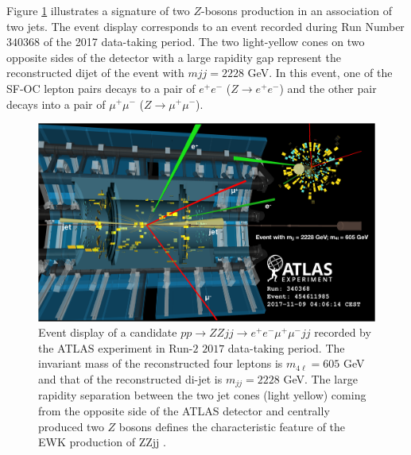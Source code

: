 Figure \ref{fig:EventDisplayZZjj} illustrates a signature of two $Z$-bosons production in an association of two jets. The event display corresponds to an event recorded during Run Number $340368$ of the 2017 data-taking period. The two light-yellow cones on two opposite sides of the detector with a large rapidity gap represent the reconstructed dijet of the event with $mjj = 2228$ GeV. In this event, one of the SF-OC lepton pairs decays to a pair of $e^+e^-$ ($Z\rightarrow e^+e^-$) and the other pair decays into a pair of $\mu^+\mu^-$ ($Z\rightarrow \mu^+\mu^-$).

\begin{figure}
\centering
\includegraphics[width=.9\linewidth]{figures/AnalysisOverview/ZZjjEventDisplay.png}  
\caption{Event display of a candidate $pp \rightarrow ZZjj \rightarrow e^+e^-\mu^+\mu^- jj $ recorded by the ATLAS experiment in Run-$2$ $2017$ data-taking period. The invariant mass of the reconstructed four leptons is $m_{4\ell} = 605$ GeV and that of the reconstructed di-jet is $m_{jj} = 2228$ GeV. The large rapidity separation between the two jet cones (light yellow) coming from the opposite side of the ATLAS detector and centrally produced two $Z$ bosons defines the characteristic feature of the EWK production of ZZjj \label{fig:EventDisplayZZjj} \cite{ATLASZZjj}.}
\end{figure}
